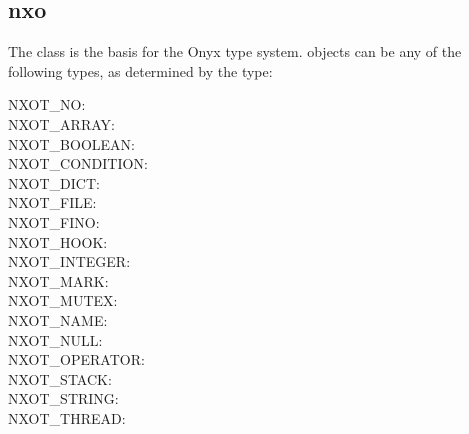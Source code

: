 %
%
%
%
%              

\subsection{nxo}
\label{nxo}

The  class is the basis for the Onyx type system.
 objects can be any of the following types, as determined by the
 type:
\begin{description}
\item[NXOT\_NO: ] 
\item[NXOT\_ARRAY: ] 
\item[NXOT\_BOOLEAN: ] 
\item[NXOT\_CONDITION: ] 
\item[NXOT\_DICT: ] 
\item[NXOT\_FILE: ] 
\item[NXOT\_FINO: ] 
\item[NXOT\_HOOK: ] 
\item[NXOT\_INTEGER: ] 
\item[NXOT\_MARK: ] 
\item[NXOT\_MUTEX: ] 
\item[NXOT\_NAME: ] 
\item[NXOT\_NULL: ] 
\item[NXOT\_OPERATOR: ] 
\item[NXOT\_STACK: ] 
\item[NXOT\_STRING: ] 
\item[NXOT\_THREAD: ] 
\end{description}

